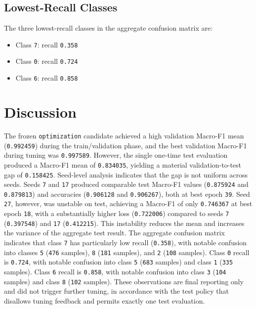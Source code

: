 \documentclass[10pt]{article}
\begin{document}
\subsection{Lowest-Recall Classes}
The three lowest-recall classes in the aggregate confusion matrix are:
\begin{itemize}
\item Class \texttt{7}: recall \texttt{0.358}
\item Class \texttt{0}: recall \texttt{0.724}
\item Class \texttt{6}: recall \texttt{0.858}
\end{itemize}
\section{Discussion}
The frozen \texttt{optimization} candidate achieved a high validation Macro-F1 mean (\texttt{0.992459}) during the train/validation phase, and the best validation Macro-F1 during tuning was \texttt{0.997589}. However, the single one-time test evaluation produced a Macro-F1 mean of \texttt{0.834035}, yielding a material validation-to-test gap of \texttt{0.158425}.
Seed-level analysis indicates that the gap is not uniform across seeds. Seeds \texttt{7} and \texttt{17} produced comparable test Macro-F1 values (\texttt{0.875924} and \texttt{0.879813}) and accuracies (\texttt{0.906128} and \texttt{0.906267}), both at best epoch \texttt{39}. Seed \texttt{27}, however, was unstable on test, achieving a Macro-F1 of only \texttt{0.746367} at best epoch \texttt{18}, with a substantially higher loss (\texttt{0.722006}) compared to seeds \texttt{7} (\texttt{0.397548}) and \texttt{17} (\texttt{0.412215}). This instability reduces the mean and increases the variance of the aggregate test result.
The aggregate confusion matrix indicates that class \texttt{7} has particularly low recall (\texttt{0.358}), with notable confusion into classes \texttt{5} (\texttt{476} samples), \texttt{8} (\texttt{181} samples), and \texttt{2} (\texttt{108} samples). Class \texttt{0} recall is \texttt{0.724}, with notable confusion into class \texttt{5} (\texttt{683} samples) and class \texttt{1} (\texttt{335} samples). Class \texttt{6} recall is \texttt{0.858}, with notable confusion into class \texttt{3} (\texttt{104} samples) and class \texttt{8} (\texttt{102} samples).
These observations are final reporting only and did not trigger further tuning, in accordance with the test policy that disallows tuning feedback and permits exactly one test evaluation.
\end{document}
